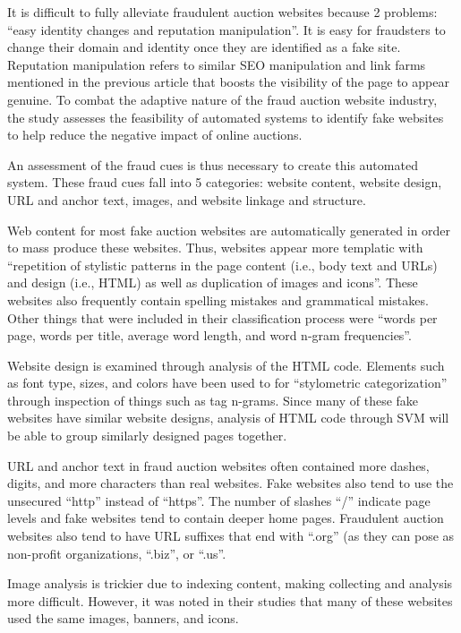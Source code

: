 \documentclass{eptcs}
\begin{document}
It is difficult to fully alleviate fraudulent auction websites because 2 problems: “easy identity changes and reputation manipulation”. It is easy for fraudsters to change their domain and identity once they are identified as a fake site.  Reputation manipulation refers to similar SEO manipulation and link farms mentioned in the previous article that boosts the visibility of the page to appear genuine. To combat the adaptive nature of the fraud auction website industry, the study assesses the feasibility of automated systems to identify fake websites to help reduce the negative impact of online auctions. 

An assessment of the fraud cues is thus necessary to create this automated system. These fraud cues fall into 5 categories: website content, website design, URL and anchor text, images, and website linkage and structure. 

Web content for most fake auction websites are automatically generated in order to mass produce these websites. Thus, websites appear more templatic with “repetition of stylistic patterns in the page content (i.e., body text and URLs) and design (i.e., HTML) as well as duplication of images and icons”. These websites also frequently contain spelling mistakes and grammatical mistakes. Other things that were included in their classification process were “words per page, words per title, average word length, and word n-gram frequencies”.

Website design is examined through analysis of the HTML code. Elements such as font type, sizes, and colors have been used to for “stylometric categorization” through inspection of things such as tag n-grams. Since many of these fake websites have similar website designs, analysis of HTML code through SVM will be able to group similarly designed pages together. 

URL and anchor text in fraud auction websites often contained more dashes, digits, and more characters than real websites. Fake websites also tend to use the unsecured “http” instead of “https”. The number of slashes “/” indicate page levels and fake websites tend to contain deeper home pages. Fraudulent auction websites also tend to have URL suffixes that end with “.org” (as they can pose as non-profit organizations, “.biz”, or “.us”. 

Image analysis is trickier due to indexing content, making collecting and analysis more difficult. However, it was noted in their studies that many of these websites used the same images, banners, and icons. 
\end{document}
